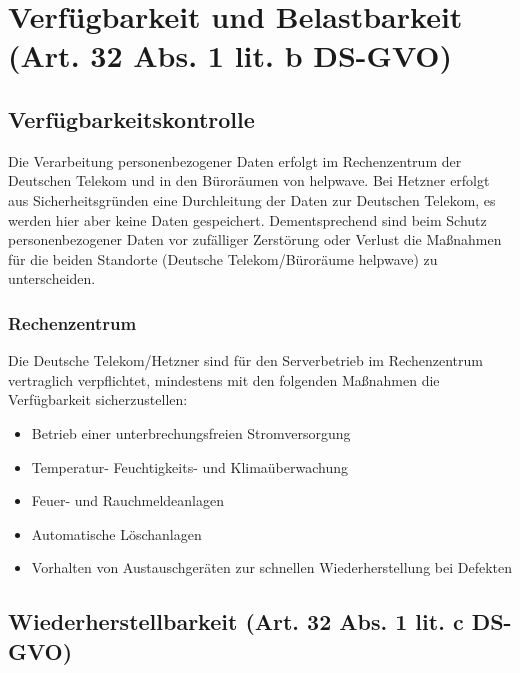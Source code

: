 \documentclass[10pt]{article}
\begin{document}
\section{Verfügbarkeit und Belastbarkeit (Art. 32 Abs. 1 lit. b DS-GVO)}
\subsection{Verfügbarkeitskontrolle}
Die Verarbeitung personenbezogener Daten erfolgt im Rechenzentrum der Deutschen
Telekom und in den Büroräumen von helpwave. Bei Hetzner erfolgt aus Sicherheitsgründen eine Durchleitung der Daten zur Deutschen Telekom, es werden hier aber keine Daten gespeichert. Dementsprechend sind beim Schutz personenbezogener Daten vor zufälliger Zerstörung oder Verlust die Maßnahmen für die beiden Standorte (Deutsche Telekom/Büroräume helpwave) zu unterscheiden.
\subsubsection{Rechenzentrum}
Die Deutsche Telekom/Hetzner sind für den Serverbetrieb im Rechenzentrum vertraglich
verpflichtet, mindestens mit den folgenden Maßnahmen die Verfügbarkeit sicherzustellen:
\begin{itemize}
	\item Betrieb einer unterbrechungsfreien Stromversorgung
	\item Temperatur- Feuchtigkeits- und Klimaüberwachung
	\item Feuer- und Rauchmeldeanlagen
	\item Automatische Löschanlagen
	\item Vorhalten von Austauschgeräten zur schnellen Wiederherstellung bei Defekten
\end{itemize}

\subsection{Wiederherstellbarkeit (Art. 32 Abs. 1 lit. c DS-GVO)}
\end{document}
